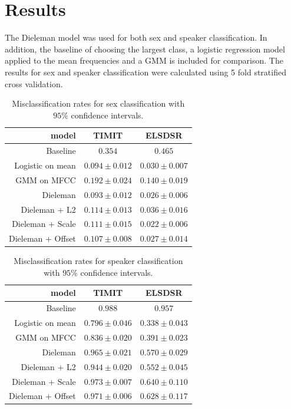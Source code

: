 \section{Results}

The Dieleman model was used for both sex and speaker classification. In addition, the baseline of choosing the largest class, a logistic regression model applied to the mean frequencies and a GMM is included for comparison. The results for sex and speaker classification were calculated using 5 fold stratified cross validation.

\begin{table}[H]
\centering
\begin{tabular}{r|c|c}
model & TIMIT & ELSDSR \\ \hline
                    Baseline & $0.354$ & $0.465$ \\
                    Logistic on mean & $0.094 \pm 0.012$ & $0.030 \pm 0.007$ \\
                 GMM on MFCC & $0.192 \pm 0.024$ & $0.140 \pm 0.019$ \\
                    Dieleman & $0.093 \pm 0.012$ & $0.026 \pm 0.006$ \\
     Dieleman + L2 & $0.114 \pm 0.013$ & $0.036 \pm 0.016$ \\
  Dieleman + Scale & $0.111 \pm 0.015$ & $0.022 \pm 0.006$ \\
 Dieleman + Offset & $0.107 \pm 0.008$ & $0.027 \pm 0.014$ \\
\end{tabular}
\caption{Misclassification rates for sex classification with $95\%$ confidence intervals.}
\label{tab:results-sex}
\end{table}

\begin{table}[H]
\centering
\begin{tabular}{r|c|c}
model & TIMIT & ELSDSR \\ \hline
                    Baseline & $0.988$ & $0.957$ \\
                    Logistic on mean & $0.796 \pm 0.046$ & $0.338 \pm 0.043$ \\
                 GMM on MFCC & $0.836 \pm 0.020$ & $0.391 \pm 0.023$ \\
                    Dieleman & $0.965 \pm 0.021$ & $0.570 \pm 0.029$ \\
     Dieleman + L2 & $0.944 \pm 0.020$ & $0.552 \pm 0.045$ \\
  Dieleman + Scale & $0.973 \pm 0.007$ & $0.640 \pm 0.110$ \\
 Dieleman + Offset & $0.971 \pm 0.006$ & $0.628 \pm 0.117$ \\
\end{tabular}
\caption{Misclassification rates for speaker classification with $95\%$ confidence intervals.}
\label{tab:results-speaker}
\end{table}

